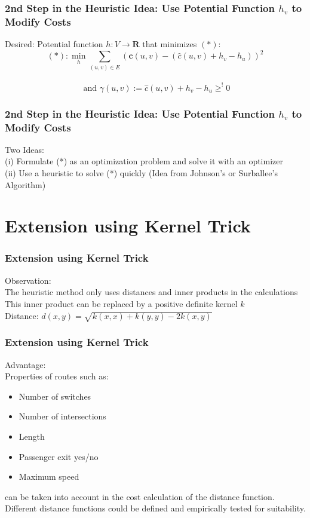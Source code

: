 \documentclass[
	11pt, %
]{beamer}
\begin{document}
\begin{frame}
      \frametitle{2nd Step in the Heuristic Idea: Use Potential Function $h_v$ to Modify Costs}
      Desired: Potential function $h: V \rightarrow \mathbf{R}$ that minimizes $(*):$\\

$$ (*): \min_{h} \sum_{(u,v) \in E} (\mathbf{c}(u,v)-(\hat{c}(u,v)+h_v-h_u))^2 $$\\
  $$ \text{ and } \gamma(u,v):= \hat{c}(u,v) + h_v-h_u\ge^! 0$$

\end{frame}

\begin{frame}
      \frametitle{2nd Step in the Heuristic Idea: Use Potential Function $h_v$ to Modify Costs}
      Two Ideas: \\
      (i) Formulate (*) as an optimization problem and solve it with an optimizer \\
      (ii) Use a heuristic to solve (*) quickly (Idea from Johnson's or Surballee's Algorithm)
\end{frame}

\section{Extension using Kernel Trick}
\begin{frame}
      \frametitle{Extension using Kernel Trick}
      Observation:\\
      The heuristic method only uses distances and inner products in the calculations\\
      This inner product can be replaced by a positive definite kernel $k$\\
      Distance: $d(x,y) = \sqrt{k(x,x)+k(y,y)-2k(x,y)}$
      
\end{frame}

\begin{frame}
      \frametitle{Extension using Kernel Trick}
      Advantage:\\
      Properties of routes such as:
      \begin{itemize}
       \item Number of switches
       \item Number of intersections
       \item Length
       \item Passenger exit yes/no
       \item Maximum speed
     \end{itemize}
     can be taken into account in the cost calculation of the distance function.\\
     
     Different distance functions could be defined and empirically tested for suitability.
       
\end{frame}
\end{document}
